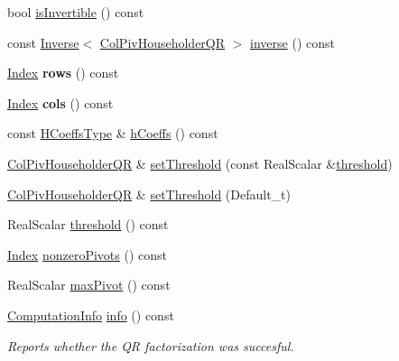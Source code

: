 \begin{DoxyCompactItemize}
\item 
bool \hyperlink{group___q_r___module_a945720f8d683f8ebe97fa807edd3142a}{is\+Invertible} () const
\item 
const \hyperlink{class_eigen_1_1_inverse}{Inverse}$<$ \hyperlink{group___q_r___module_class_eigen_1_1_col_piv_householder_q_r}{Col\+Piv\+Householder\+QR} $>$ \hyperlink{group___q_r___module_a31c45402e74774d9cd13af0e57a6b72f}{inverse} () const
\item 
\mbox{\label{group___q_r___module_a7b149d8acc35378384bd8cd1b7335545}} 
\hyperlink{namespace_eigen_a62e77e0933482dafde8fe197d9a2cfde}{Index} {\bfseries rows} () const
\item 
\mbox{\label{group___q_r___module_a5d8f3537c8589e6dcdec278081d50f3c}} 
\hyperlink{namespace_eigen_a62e77e0933482dafde8fe197d9a2cfde}{Index} {\bfseries cols} () const
\item 
const \hyperlink{class_eigen_1_1internal_1_1_tensor_lazy_evaluator_writable}{H\+Coeffs\+Type} \& \hyperlink{group___q_r___module_ac5943d19aa5fd96340c7df6874fcb1b9}{h\+Coeffs} () const
\item 
\hyperlink{group___q_r___module_class_eigen_1_1_col_piv_householder_q_r}{Col\+Piv\+Householder\+QR} \& \hyperlink{group___q_r___module_ae712cdc9f0e521cfc8061bee58ff55ee}{set\+Threshold} (const Real\+Scalar \&\hyperlink{group___q_r___module_a72276adb1aa11f870f50d0bd58af014d}{threshold})
\item 
\hyperlink{group___q_r___module_class_eigen_1_1_col_piv_householder_q_r}{Col\+Piv\+Householder\+QR} \& \hyperlink{group___q_r___module_a648df14c457ceceb09d933d06d3bdded}{set\+Threshold} (Default\+\_\+t)
\item 
Real\+Scalar \hyperlink{group___q_r___module_a72276adb1aa11f870f50d0bd58af014d}{threshold} () const
\item 
\hyperlink{namespace_eigen_a62e77e0933482dafde8fe197d9a2cfde}{Index} \hyperlink{group___q_r___module_a796610bab81f0527aa1ae440c71f58a4}{nonzero\+Pivots} () const
\item 
Real\+Scalar \hyperlink{group___q_r___module_aac8c43d720170980f582d01494df9e8f}{max\+Pivot} () const
\item 
\hyperlink{group__enums_ga85fad7b87587764e5cf6b513a9e0ee5e}{Computation\+Info} \hyperlink{group___q_r___module_a5c756a789175197cab3eff3a3e479ef2}{info} () const
\begin{DoxyCompactList}\small\item\em Reports whether the QR factorization was succesful. \end{DoxyCompactList}\item 

\end{DoxyCompactItemize}
